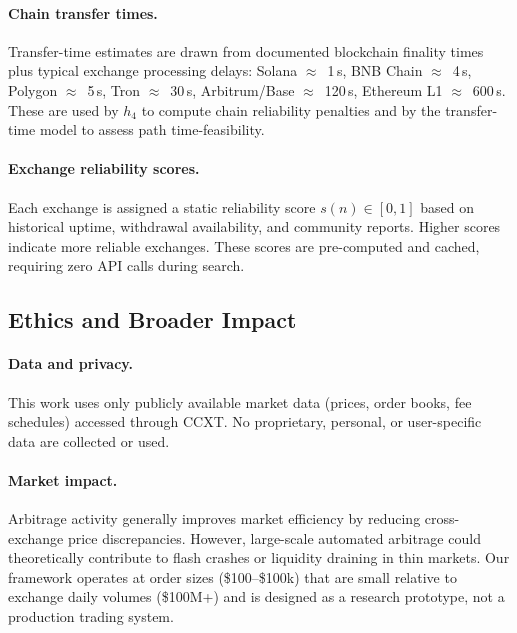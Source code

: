 \paragraph{Chain transfer times.}
Transfer-time estimates are drawn from documented blockchain finality times plus typical exchange processing delays: Solana $\approx$~1\,s, BNB Chain $\approx$~4\,s, Polygon $\approx$~5\,s, Tron $\approx$~30\,s, Arbitrum/Base $\approx$~120\,s, Ethereum L1 $\approx$~600\,s. These are used by $h_4$ to compute chain reliability penalties and by the transfer-time model to assess path time-feasibility.

\paragraph{Exchange reliability scores.}
Each exchange is assigned a static reliability score $s(n) \in [0,1]$ based on historical uptime, withdrawal availability, and community reports. Higher scores indicate more reliable exchanges. These scores are pre-computed and cached, requiring zero API calls during search.

\subsection{Ethics and Broader Impact}
\label{sec:ethics_appendix}

\paragraph{Data and privacy.}
This work uses only publicly available market data (prices, order books, fee schedules) accessed through CCXT. No proprietary, personal, or user-specific data are collected or used.

\paragraph{Market impact.}
Arbitrage activity generally improves market efficiency by reducing cross-exchange price discrepancies. However, large-scale automated arbitrage could theoretically contribute to flash crashes or liquidity draining in thin markets. Our framework operates at order sizes (\$100--\$100k) that are small relative to exchange daily volumes (\$100M+) and is designed as a research prototype, not a production trading system.

